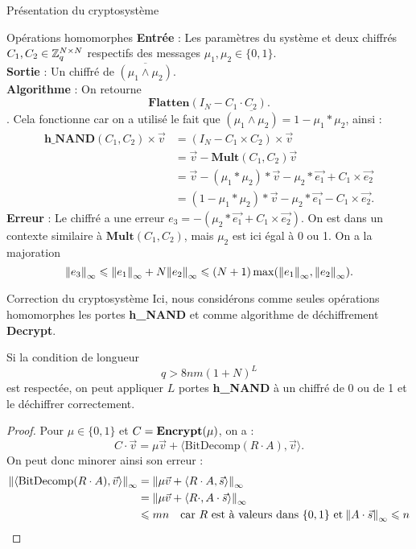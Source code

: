 \begin{section}{Présentation du cryptosystème}
\begin{subsection}{Opérations homomorphes}
	\textbf{Entrée} : Les paramètres du système et deux chiffrés $C_1, C_2 \in \mathbb{Z}_q^{N \times N}$ respectifs des messages $\mu_1, \mu_2 \in \{ 0,1\}$.\\
	\textbf{Sortie} : Un chiffré de $\overline{(\mu_1 \land \mu_2)}$. \\
	\textbf{Algorithme} : On retourne \[\textbf{Flatten}(I_N - C_1 \cdot C_2).\].
	Cela fonctionne car on a utilisé le fait que $\overline{(\mu_1 \land \mu_2)} = 1 - \mu_1 * \mu_2$, ainsi :
	\begin{align*}
	\textbf{h\_NAND}(C_1, C_2) \times \vec{v} &= (I_N - C_1 \times C_2) \times \vec{v} \\
	&= \vec{v} - \textbf{Mult}(C_1, C_2)\vec{v} \\
	&= \vec{v} - (\mu_1 * \mu_2) * \vec{v} - \mu_2 * \vec{e_1} + C_1 \times \vec{e_2} \\
	&= (1 - \mu_1 * \mu_2) * \vec{v} - \mu_2 * \vec{e_1} - C_1 \times \vec{e_2}.
	\end{align*}
	\textbf{Erreur} : Le chiffré a une erreur $e_3 = -(\mu_2 * \vec{e_1} + C_1 \times \vec{e_2})$. On est dans un contexte similaire à $\textbf{Mult}(C_1, C_2)$, mais 
	$\mu_2$ est ici égal à 0 ou 1. On a la majoration
\[{\|e_3\|}_{\infty} \leqslant {\|e_1\|}_{\infty} + N {\|e_2\|}_{\infty} \leqslant (N+1) \max({\|e_1\|}_{\infty}, {\|e_2\|}_{\infty}).\]
	\end{subsection}
	\begin{subsection}{Correction du cryptosystème}
	Ici, nous considérons comme seules opérations homomorphes les portes
	\textbf{h\_NAND} et comme algorithme de déchiffrement \textbf{Decrypt}.
	\begin{prop}
	Si la condition de longueur 
	\[q > 8nm (1 + N)^L \]
	est respectée, on peut appliquer $L$ portes \textbf{h\_NAND} à un chiffré
	de 0 ou de 1 et le déchiffrer correctement.
	\end{prop}
	\begin{proof}
	Pour $\mu \in \{0,1\}$ et $C = \text{\textbf{Encrypt}}(\mu)$, on a :
	\[
	C\cdot \vec{v} = \mu \vec{v} + \langle \text{BitDecomp}(R\cdot A), \vec{v} \rangle.
	\]
	On peut donc minorer ainsi son erreur :
	\begin{align*}
	\norm{\langle \text{BitDecomp}(R\cdot A), \vec{v} \rangle}
	&= \norm{\mu \vec{v} + \langle R\cdot A, \vec{s} \rangle}\\
	&= \norm{\mu \vec{v} + \langle R\cdot , A\cdot \vec{s} \rangle} \\
	&\leqslant  m n \quad {\displaystyle \text{car $R$ est à valeurs dans $\{0,1\}$ et}
	\: \norm{A\cdot\vec{s}} \leqslant n}

\end{align*}
\end{proof}
\end{subsection}
\end{section}
